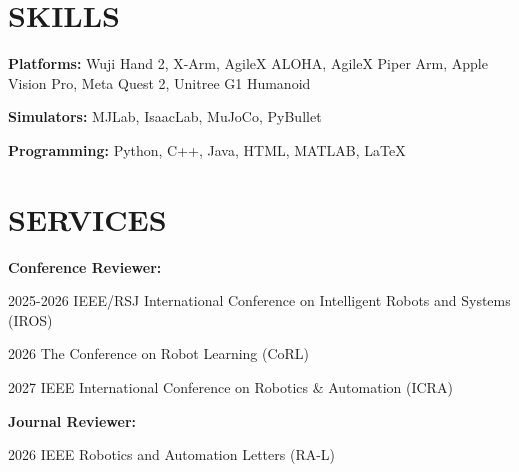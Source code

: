\documentclass[a4paper,9pt]{extarticle}
\begin{document}
\section*{{\textbf{\fontsize{14pt}{8pt}\selectfont S}\textbf{\scshape KILLS}}}
\vspace{-0.10in}
\textbf{Platforms:}{ Wuji Hand 2, X-Arm, AgileX ALOHA, AgileX Piper Arm, Apple Vision Pro, Meta Quest 2, Unitree
G1 Humanoid}
\par\vspace{1pt}\noindent
\textbf{Simulators:}{ MJLab, IsaacLab, MuJoCo, PyBullet}
\par\vspace{1pt}\noindent
\textbf{Programming:}{ Python, C++, Java, HTML, MATLAB, \LaTeX}

\section*{{\textbf{\fontsize{14pt}{8pt}\selectfont S}\textbf{\scshape ERVICES}}}
\vspace{-0.10in}
\textbf{Conference Reviewer:}  \par 2025-2026 IEEE/RSJ International Conference on Intelligent Robots and Systems (IROS)  \par 2026 The Conference on Robot Learning (CoRL)  \par 2027 IEEE International Conference on Robotics \& Automation (ICRA)
\par\vspace{1pt}\noindent
\textbf{Journal Reviewer:}{ \par 2026 IEEE Robotics and Automation Letters (RA-L)}
\end{document}
